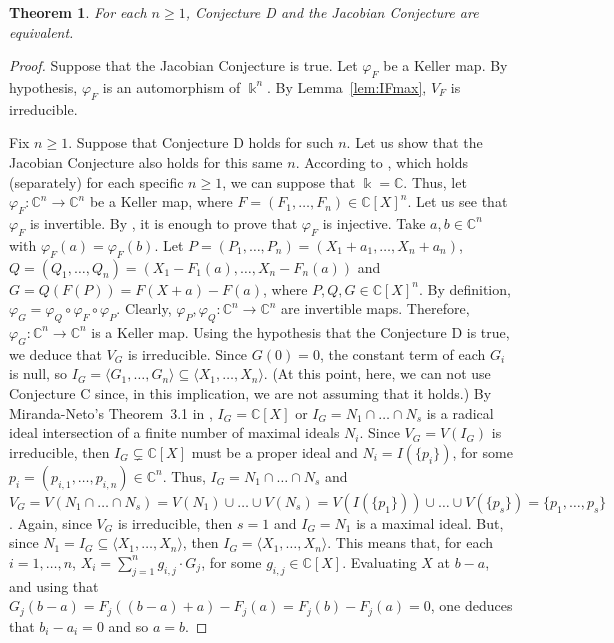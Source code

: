 \documentclass[11pt,reqno]{amsart}
\newtheorem{theorem}{Theorem}[section]
\theoremstyle{definition}
\newcommand{\mbk}{\mbox{$\Bbbk$}}
\newcommand{\mbc}{\mbox{$\mathbb{C}$}}
\begin{document}
\begin{theorem}\label{theo:CD=CJ}
For each $n\geq 1$, Conjecture {\rm D} and the Jacobian Conjecture are equivalent. 
\end{theorem}
\begin{proof}
Suppose that the Jacobian Conjecture is true. Let $\varphi_F$ be a Keller map. 
By hypothesis, $\varphi_F$ is an automorphism of $\mbk^n$. By Lemma~\ref{lem:IFmax}, $V_F$ 
is irreducible. 

Fix $n\geq 1$. Suppose that Conjecture D holds for such $n$. 
Let us show that the Jacobian Conjecture also holds for this same $n$. 
According to \cite[Lemma~1.1.14]{vde1}, which holds (separately) for each specific $n\geq 1$, 
we can suppose that $\mbk=\mbc$. Thus, let $\varphi_F:\mbc^n\to\mbc^n$ be a Keller map, 
where $F=(F_1,\ldots,F_n)\in\mbc[X]^n$. 
Let us see that $\varphi_F$ is invertible. 
By \cite[Proof of Theorem~4.2.1, page 82]{vde1}, it is enough to prove that  
$\varphi_F$ is injective. Take
$a,b\in\mbc^n$ with $\varphi_F(a)=\varphi_F(b)$. 
Let $P=(P_1,\ldots,P_n)=(X_1+a_1,\ldots,X_n+a_n)$,
$Q=(Q_1,\ldots,Q_n)=(X_1-F_1(a),\ldots,X_n-F_n(a))$ and 
$G=Q(F(P))=F(X+a)-F(a)$, where $P,Q,G\in\mbc[X]^n$. By definition, 
$\varphi_G=\varphi_Q\circ\varphi_F\circ\varphi_P$.
Clearly, $\varphi_P,\varphi_Q:\mbc^n\to\mbc^n$ are invertible maps. 
Therefore, $\varphi_G:\mbc^n\to\mbc^n$ is a Keller map. 
Using the hypothesis that the Conjecture D is true, we deduce that $V_G$ is irreducible. 
Since $G(0)=0$, the constant term of each $G_i$ is null, so 
$I_G=\langle G_1,\ldots,G_n\rangle\subseteq \langle X_1,\ldots,X_n\rangle$.
(At this point, here, we can not use Conjecture C since, in this implication, 
we are not assuming that it holds.)
By Miranda-Neto's Theorem~3.1 in \cite{mn}, $I_G=\mbc[X]$ or $I_G=N_1\cap\ldots\cap N_s$ 
is a radical ideal intersection of a finite number of maximal ideals $N_i$. 
Since $V_G=V(I_G)$ is irreducible, then $I_G\subsetneq \mbc[X]$ must be a proper ideal 
and $N_i=I(\{p_i\})$, for some $p_i=(p_{i,1},\ldots,p_{i,n})\in\mbc^n$.
Thus, $I_G=N_1\cap\ldots\cap N_s$ and $V_G=V(N_1\cap\ldots\cap N_s)=
V(N_1)\cup\ldots\cup V(N_s)=V(I(\{p_1\}))\cup\ldots\cup V(\{p_s\})=\{p_1,\ldots,p_s\}$. 
Again, since $V_G$ is irreducible, then $s=1$ and $I_G=N_1$ is a maximal ideal. 
But, since $N_1=I_G\subseteq \langle X_1,\ldots,X_n\rangle$, then
$I_G=\langle X_1,\ldots,X_n\rangle$. This means that, for each $i=1,\ldots, n$, 
$X_i=\sum_{j=1}^ng_{i,j}\cdot G_j$, for some $g_{i,j}\in\mbc[X]$. Evaluating $X$ at $b-a$, 
and using that $G_j(b-a)=F_j((b-a)+a)-F_j(a)=F_j(b)-F_j(a)=0$, one deduces that $b_i-a_i=0$ and so
$a=b$.
\end{proof}
\end{document}
